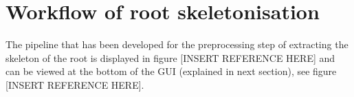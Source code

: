 %
%
%


\section{Workflow of root skeletonisation}

The pipeline that has been developed for the preprocessing step of extracting the skeleton of the root is displayed in figure [INSERT REFERENCE HERE] and can be viewed at the bottom of the GUI (explained in next section), see figure [INSERT REFERENCE HERE].

